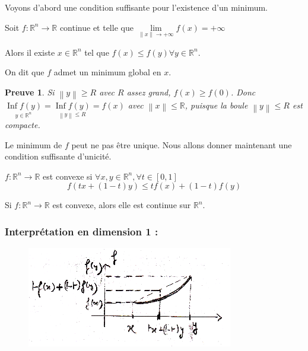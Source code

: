 \documentclass[a4paper,11pt]{article}
\newcommand{\R}{\mathbb{R}}
\newcommand{\norm}[1]{\left\lVert#1\right\rVert}
\newcommand{\deffonc}[3]{#1 : #2 \longrightarrow #3}
\DeclareMathOperator{\Inf}{Inf}
\theoremstyle{plain} %
\newtheorem{preuve}{Preuve}
\begin{document}
Voyons d'abord une condition suffisante pour l'existence d'un minimum.

\begin{ftheo}
    Soit $\deffonc{f}{\R^n}{\R}$ continue et telle que $\underset{\norm{x} \to +\infty}{\lim} f(x) = + \infty$

    Alors il existe $x \in \R^n$ tel que $f(x) \leq f(y) \forall y \in \R^n$.
\end{ftheo}

\begin{remark}
    On dit que $f$ admet un minimum global en $x$.
\end{remark}

\begin{preuve}
    Si $\norm{y} \geq R$ avec $R$ assez grand, $f(x) \geq f(0)$.
    Donc $\underset{y \in \R^n}{\Inf f(y)} = \underset{\norm{y} \leq R}{\Inf f(y)} = f(x)$ avec $\norm{x} \leq \R$, puisque la boule $\norm{y} \leq R$ est compacte.
\end{preuve}

Le minimum de $f$ peut ne pas être unique. Nous allons donner maintenant une condition
suffisante d'unicité.

\begin{fdef}
    $\deffonc{f}{\R^n}{\R}$ est convexe si $\forall x,y \in \R^n, \forall t \in [0,1]$
    \[
        f(tx + (1-t)y) \leq tf(x) + (1-t)f(y)
    \]
\end{fdef}

\begin{remark}
    Si $\deffonc{f}{\R^n}{\R}$ est convexe, alors elle est continue sur $\R^n$.
\end{remark}

\subsubsection*{Interprétation en dimension 1 :}
\begin{figure}[h]
    \centering
    \includegraphics[scale=0.7]{7optim-dim1-convexe.png}
    \label{fig:7optim-dim1-convexe}
\end{figure}
\end{document}
